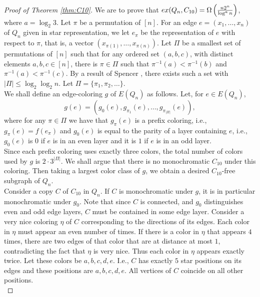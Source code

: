 \documentclass[11pt, a4paper]{article}
\newcommand{\ex}{{\rm  ex}}
\begin{document}
\begin{proof}[Proof of Theorem \ref{thm:C10}]
We are to prove that $\ex(Q_n, C_{10}) = \Omega\left( \frac{n2^n}{\log^a n} \right)$, where $a = \log_2 3$.
Let $\pi$ be a permutation of $[n]$.  For an edge $e=(x_1, \ldots, x_n)$ of $Q_n$ given in star representation, we let $e_\pi$ be the representation of $e$ with respect to $\pi$, that is, a vector $(x_{\pi(1)}, \ldots, x_{\pi(n)})$.
Let $\Pi$ be a smallest  set of permutations of $[n]$ such that for any ordered set $(a, b, c)$,  with distinct elements $a, b, c \in [n]$,  there is $\pi \in \Pi$ such that $\pi^{-1}(a)< \pi^{-1}(b)$ and $\pi^{-1}(a)< \pi^{-1}(c)$.
By a result of Spencer \cite{S}, there exists such a set with $|\Pi|\leq  \log_2\log_2 n$. Let $\Pi = \{\pi_1,  \pi_2, \ldots \}$.  \\

We shall define an edge-coloring $g$ of $E(Q_n)$ as follows. 
Let, for $e\in E(Q_n)$, $$g(e) = \left(g_0(e), g_{\pi_1}(e), \ldots, g_{\pi_{|\Pi|}}(e)\right),$$ where for any $\pi\in \Pi$ we have that
$g_\pi(e)$ is  a prefix coloring, i.e.,  $g_\pi(e)=f(e_{\pi})$ and $g_0(e)$ is equal to the parity of a layer containing $e$, i.e., $g_0(e)$ is $0$ if $e$ is in an even layer and it is $1$ if $e$ is in an odd layer.  \\

Since each prefix coloring uses exactly three colors, the total number of colors used by $g$ is $2\cdot 3^{|\Pi|}$. 
We shall argue that there is no monochromatic $C_{10}$ under this coloring. Then taking a largest color class of $g$, we obtain a desired $C_{10}$-free subgraph of $Q_n$. \\



Consider a copy $C$ of $C_{10}$ in $Q_n$. 
If $C$ is monochromatic under $g$, it is in particular monochromatic under $g_0$. Note that since $C$ is connected, and $g_0$ distinguishes even and odd edge layers, $C$ must be contained in some edge layer.
Consider a very nice coloring  $\eta$ of $C$ corresponding to the directions of its edges. Each color in $\eta$ must  appear an even number of times.
If there is a color in $\eta$ that appears $4$ times, there are two edges of that color that are at distance at most $1$, contradicting the fact that $\eta$ is very nice. 
Thus each color in $\eta$ appears exactly twice. Let these colors be $a, b, c, d, e$. 
I.e.,  $C$ has exactly $5$ star positions on its edges and  these positions are $a, b, c, d, e $.  All vertices of $C$ coincide on all other positions. \\


\end{proof}
\end{document}
